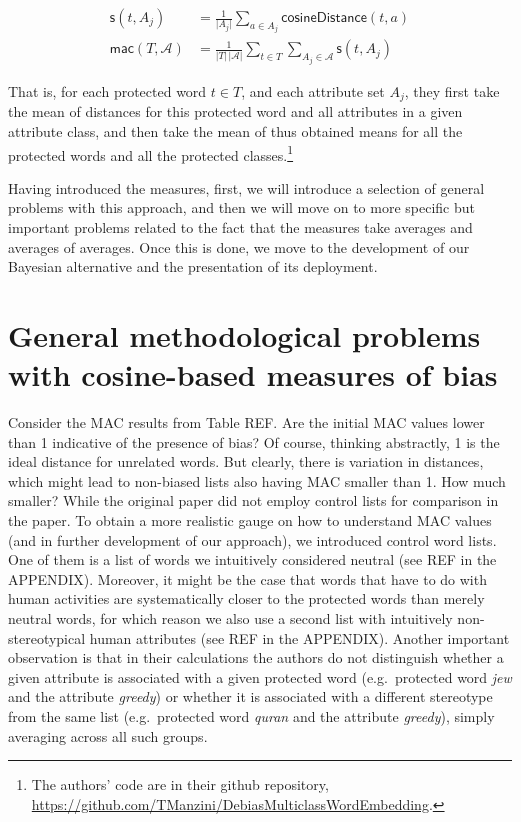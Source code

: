 \documentclass[
  10pt,
  dvipsnames,enabledeprecatedfontcommands]{scrartcl}
\begin{document}
\begin{align*}
\mathsf{s}(t, A_j) & = \frac{1}{\vert A_j\vert}\sum_{a\in A_j}\mathsf{cosineDistance}(t,a) \\
\mathsf{mac}(T,\mathcal{A}) & = \frac{1}{\vert T \vert \,\vert \mathcal{A}\vert}\sum_{t \in T }\sum_{A_j \in \mathcal{A}}    \mathsf{s}(t,A_j)
\end{align*}

\noindent That is, for each protected word \(t\in T\), and each
attribute set \(A_j\), they first take the mean of distances for this
protected word and all attributes in a given attribute class, and then
take the mean of thus obtained means for all the protected words and all
the protected classes.\footnote{The authors' code are in their github
  repository,
  \url{https://github.com/TManzini/DebiasMulticlassWordEmbedding}.}

Having introduced the measures, first, we will introduce a selection of
general problems with this approach, and then we will move on to more
specific but important problems related to the fact that the measures
take averages and averages of averages. Once this is done, we move to
the development of our Bayesian alternative and the presentation of its
deployment.

\hypertarget{general-methodological-problems-with-cosine-based-measures-of-bias}{%
\section{General methodological problems with cosine-based measures of
bias}\label{general-methodological-problems-with-cosine-based-measures-of-bias}}

Consider the MAC results from Table REF. Are the initial MAC values
lower than 1 indicative of the presence of bias? Of course, thinking
abstractly, 1 is the ideal distance for unrelated words. But clearly,
there is variation in distances, which might lead to non-biased lists
also having MAC smaller than 1. How much smaller? While the original
paper did not employ control lists for comparison in the paper. To
obtain a more realistic gauge on how to understand MAC values (and in
further development of our approach), we introduced control word lists.
One of them is a list of words we intuitively considered neutral (see
REF in the APPENDIX). Moreover, it might be the case that words that
have to do with human activities are systematically closer to the
protected words than merely neutral words, for which reason we also use
a second list with intuitively non-stereotypical human attributes (see
REF in the APPENDIX). Another important observation is that in their
calculations the authors do not distinguish whether a given attribute is
associated with a given protected word (e.g.~protected word \emph{jew}
and the attribute \emph{greedy}) or whether it is associated with a
different stereotype from the same list (e.g.~protected word
\emph{quran} and the attribute \emph{greedy}), simply averaging across
all such groups.
\end{document}
